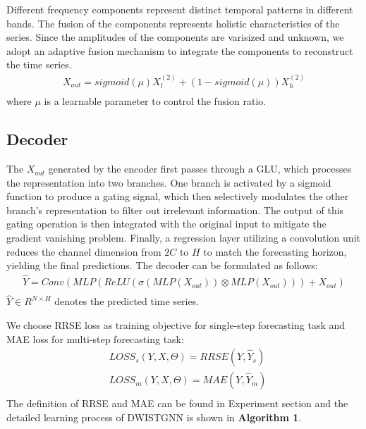 \documentclass[final,12pt]{elsarticle}
\begin{document}
Different frequency components represent 
distinct temporal patterns in different bands.  %
The fusion of the components represents 
holistic characteristics of the series.  %
Since the amplitudes of the components are varisized and unknown, 
we adopt an adaptive fusion mechanism 
to integrate the components to reconstruct the time series.  %
\begin{equation}
  \begin{aligned}
    X_{out} = sigmoid(\mu) X_{l}^{(2)} + (1-sigmoid(\mu)) X_{h}^{(2)}  \\
  \end{aligned}
\end{equation}
where $\mu$ is a learnable parameter to control the fusion ratio.


\subsection{Decoder}
\label{subsec-4.5}


The $X_{out}$ generated by the encoder 
first passes through a GLU, which processes the representation into two branches.
One branch is activated by a sigmoid function to produce a gating signal, 
which then selectively modulates the other branch's representation 
to filter out irrelevant information.  %
The output of this gating operation 
is then integrated with the original input 
to mitigate the gradient vanishing problem.  %
Finally, a regression layer utilizing a convolution unit 
reduces the channel dimension from $2C$ to $H$ 
to match the forecasting horizon, 
yielding the final predictions.  %
The decoder can be formulated as follows: 
\begin{equation}
  \begin{aligned}
    \widehat{Y} = Conv(MLP(ReLU(\sigma(MLP(X_{out})) \otimes MLP(X_{out}))) + X_{out})  \\
  \end{aligned}
\end{equation}
$\widehat{Y} \in R^{N \times H}$ 
denotes the predicted time series.  %


We choose RRSE loss 
as training objective for single-step forecasting task 
and MAE loss 
for multi-step forecasting task: 
\begin{equation}
  \begin{aligned}
    & LOSS_{s}(Y, X, \Theta) = RRSE(Y, \widehat{Y}_{s})  \\
    & LOSS_{m}(Y, X, \Theta) = MAE (Y, \widehat{Y}_{m})  \\
  \end{aligned}
\end{equation}
The definition of RRSE and MAE can be found in Experiment section 
and the detailed learning process of DWISTGNN 
is shown in \textbf{Algorithm 1}.
\end{document}
